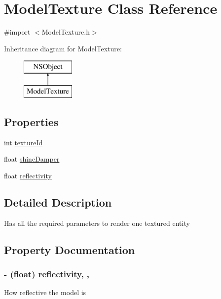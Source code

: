 \hypertarget{interface_model_texture}{}\section{Model\+Texture Class Reference}
\label{interface_model_texture}


{\ttfamily \#import $<$Model\+Texture.\+h$>$}

Inheritance diagram for Model\+Texture\+:\begin{figure}[H]
\begin{center}
\leavevmode
\includegraphics[height=2.000000cm]{interface_model_texture}
\end{center}
\end{figure}
\subsection*{Properties}
\begin{DoxyCompactItemize}
\item 
int \hyperlink{interface_model_texture_a6036cd5d7473640c480a385695dba581}{texture\+Id}
\item 
float \hyperlink{interface_model_texture_ad9d65575408a2195c3c8a654e804e8ce}{shine\+Damper}
\item 
float \hyperlink{interface_model_texture_a61a956a6fad9b4686c7299ea8f3f76c7}{reflectivity}
\end{DoxyCompactItemize}


\subsection{Detailed Description}
Has all the required parameters to render one textured entity 

\subsection{Property Documentation}
\subsubsection[{\texorpdfstring{reflectivity}{reflectivity}}]{\setlength{\rightskip}{0pt plus 5cm}-\/ (float) reflectivity\hspace{0.3cm}{\ttfamily [read]}, {\ttfamily [write]}, {\ttfamily [atomic]}}\hypertarget{interface_model_texture_a61a956a6fad9b4686c7299ea8f3f76c7}{}\label{interface_model_texture_a61a956a6fad9b4686c7299ea8f3f76c7}
How reflective the model is 
